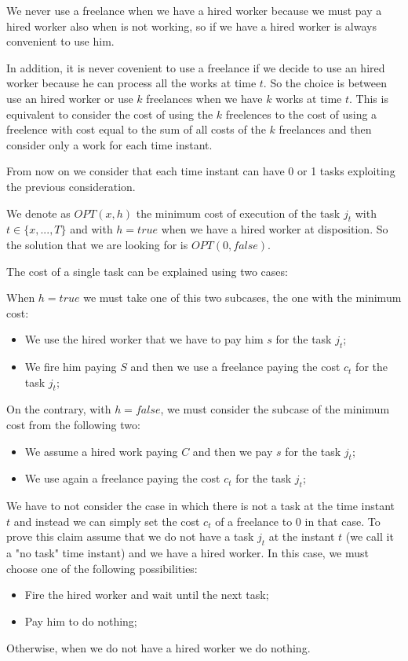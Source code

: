 \documentclass[paper=a4, fontsize=11pt]{scrartcl} %
\numberwithin{equation}{section} %
\numberwithin{figure}{section} %
\numberwithin{table}{section} %
\begin{document}
We never use a freelance when we have a hired worker because we must pay a hired worker also when is not working, so if we have a hired worker is always convenient to use him.

In addition, it is never covenient to use a freelance if we decide to use an hired worker because he can process all the works at time $t$.
So the choice is between use an hired worker or use $k$ freelances when we have $k$ works at time $t$. This is equivalent to consider the cost of using the $k$ freelences to the cost of using a freelence with cost equal to the sum of all costs of the $k$ freelances and then consider only a work for each time instant.

From now on we consider that each time instant can have 0 or 1 tasks exploiting the previous consideration.

We denote as $OPT(x, h)$ the minimum cost of execution of the task $j_t$ with $t \in \{x,...,T\}$ and with $h = true$ when we have a hired worker at disposition.
So the solution that we are looking for is $OPT(0, false)$.

The cost of a single task can be explained using two cases:

When $h = true$ we must take one of this two subcases, the one with the minimum cost:
\begin{itemize}
    \item We use the hired worker that we have to pay him $s$ for the task $j_t$;
    \item We fire him paying $S$ and then we use a freelance paying the cost $c_t$ for the task $j_t$;
\end{itemize}
On the contrary, with $h = false$, we must consider the subcase of the minimum cost from the following two:
\begin{itemize}
    \item We assume a hired work paying $C$ and then we pay $s$ for the task $j_t$;
    \item We use again a freelance paying the cost $c_t$ for the task $j_t$;
\end{itemize}

We have to not consider the case in which there is not a task at the time instant $t$ and instead we can simply set the cost $c_t$ of a freelance to $0$ in that case.
To prove this claim assume that we do not have a task $j_t$ at the instant $t$ (we call it a "no task" time instant) and we have a hired worker.
In this case, we must choose one of the following possibilities:
\begin{itemize}
    \item Fire the hired worker and wait until the next task;
    \item Pay him to do nothing;
\end{itemize}
Otherwise, when we do not have a hired worker we do nothing.
\end{document}
